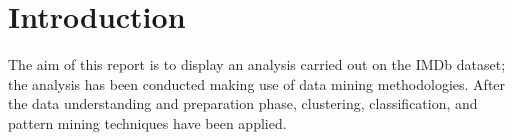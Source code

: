 \section*{Introduction}
\label{ch:introduzione}

The aim of this report is to display an analysis carried out on the IMDb dataset; the analysis has been conducted making use of data mining methodologies. 
After the data understanding and preparation phase, clustering, classification, and pattern mining techniques have been applied.
